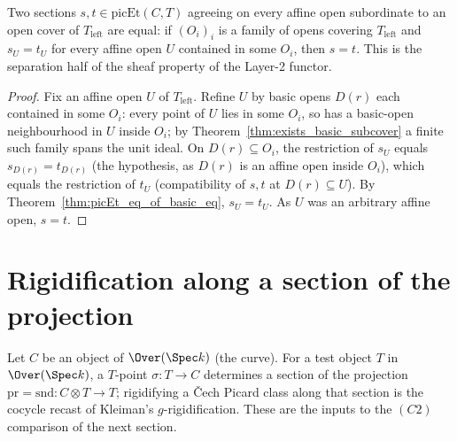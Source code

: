 \begin{theorem}
  \label{thm:picEt_ext_of_le_cover}
  \leanok
  Two sections \(s, t \in \mathrm{picEt}(C, T)\) agreeing on every affine open subordinate to an
  open cover of \(T_{\mathrm{left}}\) are equal: if \((O_i)_{i}\) is a family of opens covering
  \(T_{\mathrm{left}}\) and \(s_U = t_U\) for every affine open \(U\) contained in some \(O_i\),
  then \(s = t\). This is the separation half of the sheaf property of the Layer-2 functor.
\end{theorem}
\begin{proof}
  \leanok
  Fix an affine open \(U\) of \(T_{\mathrm{left}}\). Refine \(U\) by basic opens \(D(r)\) each
  contained in some \(O_i\): every point of \(U\) lies in some \(O_i\), so has a basic-open
  neighbourhood in \(U\) inside \(O_i\); by Theorem~\ref{thm:exists_basic_subcover} a finite such
  family spans the unit ideal. On \(D(r) \subseteq O_i\), the restriction of \(s_U\) equals
  \(s_{D(r)} = t_{D(r)}\) (the hypothesis, as \(D(r)\) is an affine open inside \(O_i\)), which
  equals the restriction of \(t_U\) (compatibility of \(s, t\) at \(D(r) \subseteq U\)). By
  Theorem~\ref{thm:picEt_eq_of_basic_eq}, \(s_U = t_U\). As \(U\) was an arbitrary affine open,
  \(s = t\).
\end{proof}

\section{Rigidification along a section of the projection}
\label{sec:rigidification}

Let \(C\) be an object of \(\Over(\Spec k)\) (the curve). For a test object \(T\) in
\(\Over(\Spec k)\), a \(T\)-point \(\sigma \colon T \to C\) determines a section of the
projection \(\mathrm{pr} = \mathrm{snd} \colon C \otimes T \to T\); rigidifying a \v Cech Picard
class along that section is the cocycle recast of Kleiman's \(g\)-rigidification. These are the
inputs to the \((C2)\) comparison of the next section.

